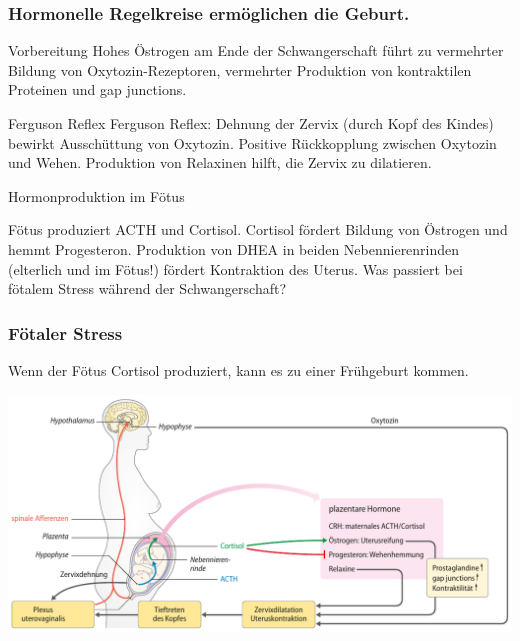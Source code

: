 \documentclass{beamer}
\begin{document}
\begin{frame}
\frametitle{Hormonelle Regelkreise ermöglichen die Geburt. }

\begin{block}{Vorbereitung}
Hohes Östrogen am Ende der Schwangerschaft  führt zu vermehrter Bildung von Oxytozin-Rezeptoren, vermehrter Produktion von  
kontraktilen Proteinen und gap junctions. 
\end{block}

\pause
\begin{block}{Ferguson Reflex}
Ferguson Reflex: Dehnung der Zervix (durch Kopf des Kindes) bewirkt Ausschüttung von Oxytozin. Positive Rückkopplung zwischen Oxytozin und Wehen. Produktion von Relaxinen hilft, die Zervix zu dilatieren. 
\end{block}

\pause

\begin{block}{Hormonproduktion im Fötus}

Fötus produziert ACTH und Cortisol. Cortisol fördert Bildung von Östrogen und hemmt Progesteron. Produktion von  DHEA in beiden Nebennierenrinden (elterlich und im Fötus!) fördert Kontraktion des Uterus. \pause \textcolor{theme}{Was passiert bei fötalem Stress während der Schwangerschaft? }

\end{block}

\end{frame}

\begin{frame}
\frametitle{Fötaler Stress }

Wenn der Fötus Cortisol produziert, kann es zu einer Frühgeburt kommen. 

\begin{center}
\includegraphics[width=\textwidth]{geburt_hormone}
\end{center}

\end{frame}
\end{document}
